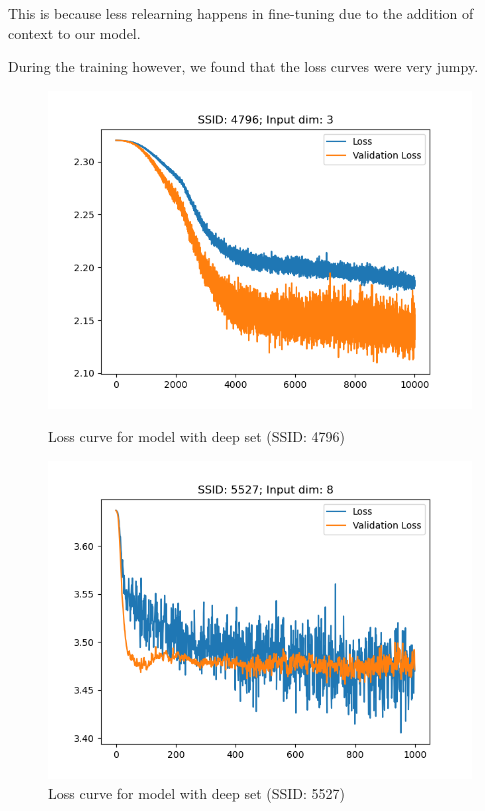 \documentclass[12pt, twoside, ngerman]{report}
\begin{document}
\iffalse

This is because less relearning happens in fine-tuning due to the addition of context to our model.

During the training however,  we found that the loss curves were very jumpy.

\begin{figure}[h]%
\centering
\begin{minipage}{0.45\textwidth}
\includegraphics[width=\textwidth]{images/DeepSetLoss4796}
\caption{Loss curve for model with deep set (SSID: 4796)}
    \label{fig:DeepSetLoss4796}
\end{minipage}\hfill
\begin{minipage}{0.45\textwidth}
\includegraphics[width=\textwidth]{images/DeepSetLoss5527}
\caption{Loss curve for model with deep set (SSID: 5527)}
    \label{fig:DeepSetLoss5527}
\end{minipage}
\end{figure}
\end{document}
